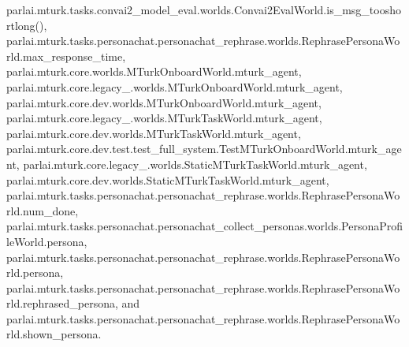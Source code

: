 parlai.\+mturk.\+tasks.\+convai2\+\_\+model\+\_\+eval.\+worlds.\+Convai2\+Eval\+World.\+is\+\_\+msg\+\_\+tooshortlong(), parlai.\+mturk.\+tasks.\+personachat.\+personachat\+\_\+rephrase.\+worlds.\+Rephrase\+Persona\+World.\+max\+\_\+response\+\_\+time, parlai.\+mturk.\+core.\+worlds.\+M\+Turk\+Onboard\+World.\+mturk\+\_\+agent, parlai.\+mturk.\+core.\+legacy\+\_.\+worlds.\+M\+Turk\+Onboard\+World.\+mturk\+\_\+agent, parlai.\+mturk.\+core.\+dev.\+worlds.\+M\+Turk\+Onboard\+World.\+mturk\+\_\+agent, parlai.\+mturk.\+core.\+legacy\+\_.\+worlds.\+M\+Turk\+Task\+World.\+mturk\+\_\+agent, parlai.\+mturk.\+core.\+dev.\+worlds.\+M\+Turk\+Task\+World.\+mturk\+\_\+agent, parlai.\+mturk.\+core.\+dev.\+test.\+test\+\_\+full\+\_\+system.\+Test\+M\+Turk\+Onboard\+World.\+mturk\+\_\+agent, parlai.\+mturk.\+core.\+legacy\+\_.\+worlds.\+Static\+M\+Turk\+Task\+World.\+mturk\+\_\+agent, parlai.\+mturk.\+core.\+dev.\+worlds.\+Static\+M\+Turk\+Task\+World.\+mturk\+\_\+agent, parlai.\+mturk.\+tasks.\+personachat.\+personachat\+\_\+rephrase.\+worlds.\+Rephrase\+Persona\+World.\+num\+\_\+done, parlai.\+mturk.\+tasks.\+personachat.\+personachat\+\_\+collect\+\_\+personas.\+worlds.\+Persona\+Profile\+World.\+persona, parlai.\+mturk.\+tasks.\+personachat.\+personachat\+\_\+rephrase.\+worlds.\+Rephrase\+Persona\+World.\+persona, parlai.\+mturk.\+tasks.\+personachat.\+personachat\+\_\+rephrase.\+worlds.\+Rephrase\+Persona\+World.\+rephrased\+\_\+persona, and parlai.\+mturk.\+tasks.\+personachat.\+personachat\+\_\+rephrase.\+worlds.\+Rephrase\+Persona\+World.\+shown\+\_\+persona.


